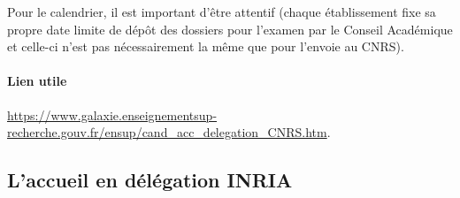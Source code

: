 Pour le calendrier, il est important d'être attentif (chaque \'etablissement fixe sa propre
date limite de d\'ep\^ot des dossiers pour l'examen par le Conseil
Acad\'emique et celle-ci n'est pas n\'ecessairement la même que pour l'envoie au CNRS). 

\vspace{-.5\baselineskip}
\paragraph*{Lien utile}\url{https://www.galaxie.enseignementsup-recherche.gouv.fr/ensup/cand_acc_delegation_CNRS.htm}.
% 
%
%
%
\subsection*{L'accueil en d\'el\'egation INRIA}

